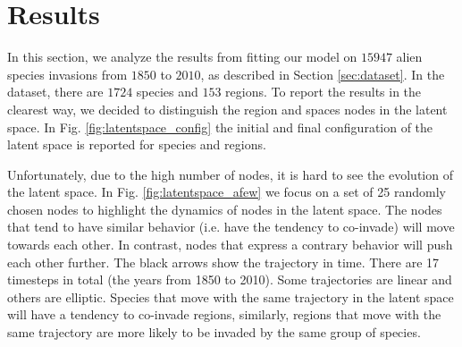 \documentclass[mscthesis]{usiinfthesis}
\begin{document}
%

\chapter{Results}

In this section, we analyze the results from fitting our model on $15947$ alien species invasions from $1850$ to $2010$, as described in Section \ref{sec:dataset}. In the dataset, there are $1724$ species and $153$ regions. To report the results in the clearest way, we decided to distinguish the region and spaces nodes in the latent space. In Fig. \ref{fig:latentspace_config} the initial and final configuration of the latent space is reported for species and regions. 

Unfortunately, due to the high number of nodes, it is hard to see the evolution of the latent space. In Fig. \ref{fig:latentspace_afew} we focus on a set of 25 randomly chosen nodes to highlight the dynamics of nodes in the latent space. The nodes that tend to have similar behavior (i.e. have the tendency to co-invade) will move towards each other. In contrast, nodes that express a contrary behavior will push each other further. The black arrows show the trajectory in time. There are 17 timesteps in total (the years from 1850 to 2010). Some trajectories are linear and others are elliptic. Species that move with the same trajectory in the latent space will have a tendency to co-invade regions, similarly, regions that move with the same trajectory are more likely to be invaded by the same group of species.
\end{document}
